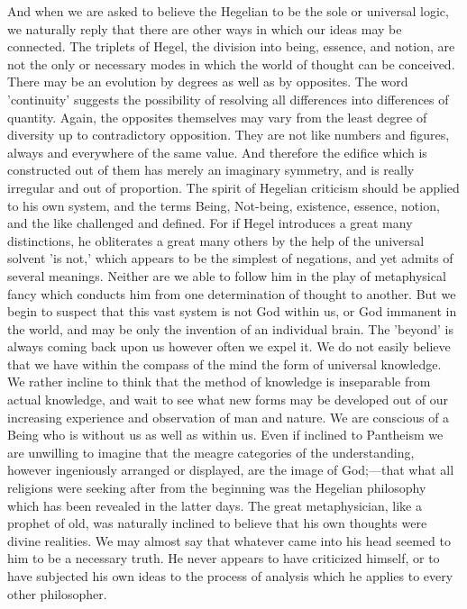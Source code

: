 \documentclass[11pt,letter]{article}
\begin{document}
\par  And when we are asked to believe the Hegelian to be the sole or universal logic, we naturally reply that there are other ways in which our ideas may be connected. The triplets of Hegel, the division into being, essence, and notion, are not the only or necessary modes in which the world of thought can be conceived. There may be an evolution by degrees as well as by opposites. The word 'continuity' suggests the possibility of resolving all differences into differences of quantity. Again, the opposites themselves may vary from the least degree of diversity up to contradictory opposition. They are not like numbers and figures, always and everywhere of the same value. And therefore the edifice which is constructed out of them has merely an imaginary symmetry, and is really irregular and out of proportion. The spirit of Hegelian criticism should be applied to his own system, and the terms Being, Not-being, existence, essence, notion, and the like challenged and defined. For if Hegel introduces a great many distinctions, he obliterates a great many others by the help of the universal solvent 'is not,' which appears to be the simplest of negations, and yet admits of several meanings. Neither are we able to follow him in the play of metaphysical fancy which conducts him from one determination of thought to another. But we begin to suspect that this vast system is not God within us, or God immanent in the world, and may be only the invention of an individual brain. The 'beyond' is always coming back upon us however often we expel it. We do not easily believe that we have within the compass of the mind the form of universal knowledge. We rather incline to think that the method of knowledge is inseparable from actual knowledge, and wait to see what new forms may be developed out of our increasing experience and observation of man and nature. We are conscious of a Being who is without us as well as within us. Even if inclined to Pantheism we are unwilling to imagine that the meagre categories of the understanding, however ingeniously arranged or displayed, are the image of God;—that what all religions were seeking after from the beginning was the Hegelian philosophy which has been revealed in the latter days. The great metaphysician, like a prophet of old, was naturally inclined to believe that his own thoughts were divine realities. We may almost say that whatever came into his head seemed to him to be a necessary truth. He never appears to have criticized himself, or to have subjected his own ideas to the process of analysis which he applies to every other philosopher.
\end{document}
